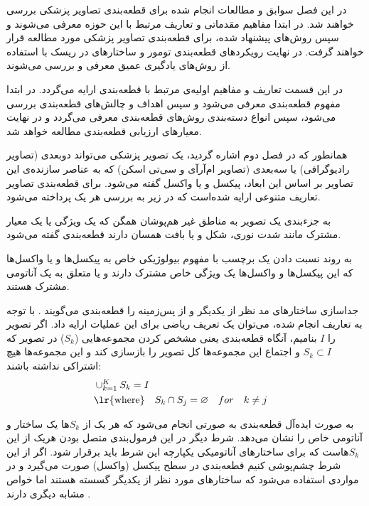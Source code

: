 

در این فصل سوابق و مطالعات انجام شده برای قطعه‌بندی تصاویر پزشکی بررسی خواهند شد. در ابتدا مفاهیم مقدماتی و تعاریف مرتبط با این حوزه معرفی می‌شوند و سپس روش‌های پیشنهاد شده، برای قطعه‌بندی تصاویر پزشکی مورد مطالعه قرار خواهند گرفت. در نهایت رویکردهای قطعه‌بندی تومور و ساختارهای در ریسک با استفاده از روش‌‌های یادگیری عمیق معرفی و بررسی می‌شوند.

در این قسمت تعاریف و مفاهیم اولیه‌ی مرتبط با قطعه‌بندی ارایه می‌گردد. در ابتدا مفهوم قطعه‌بندی معرفی می‌شود و سپس اهداف و چالش‌های قطعه‌بندی بررسی می‌شود، سپس انواع دسته‌بندی روش‌های قطعه‌بندی معرفی می‌گردد و در نهایت معیارهای ارزیابی قطعه‌بندی مطالعه خواهد شد.

همانطور که در فصل دوم اشاره گردید، یک تصویر پزشکی می‌تواند دوبعدی (تصاویر رادیوگرافی) یا سه‌بعدی (تصاویر ام‌آرآی و سی‌تی اسکن) که به عناصر سازنده‌ی این تصاویر بر اساس این ابعاد، پیکسل و یا واکسل گفته می‌شود. برای قطعه‌بندی تصاویر تعاریف متنوعی ارایه شده‌است که در زیر به بررسی هر یک پرداخته می‌شود.

 به جزء‌بندی یک تصویر به مناطق غیر هم‌پوشان همگن که یک ویژگی یا یک معیار مشترک مانند شدت نوری، شکل و یا بافت همسان دارند قطعه‌بندی گفته می‌شود.

 به روند نسبت دادن یک برچسب با مفهوم بیولوژیکی خاص به پیکسل‌ها و یا واکسل‌ها که این پیکسل‌ها و واکسل‌ها یک ویژگی خاص مشترک دارند و یا متعلق به یک آناتومی مشترک هستند. 

 جداسازی ساختارهای مد نظر از یکدیگر و از پس‌زمینه را قطعه‌بندی می‌گویند .
با توجه به تعاریف انجام شده، می‌توان یک تعریف ریاضی برای این عملیات ارایه داد. اگر تصویر را $I$ بنامیم، آنگاه قطعه‌بندی یعنی مشخص کردن مجموعه‌هایی ($S_{k}$) در تصویر که $S_{k} \subset I$ و اجتماع این مجموعه‌ها کل تصویر را بازسازی کند و این مجموعه‌ها هیچ اشتراکی نداشته باشند:
\begin{alignat}{5}
	 &\cup_{k=1}^{K} S_{k} = I     \label{seg_def} && \\
	 &\text{\lr{where}} \quad S_{k} \cap S_{j} = \varnothing \quad for \quad k \neq j && \notag
\end{alignat}

به صورت ایده‌آل قطعه‌بندی به صورتی انجام می‌شود که هر یک از $S_{k}$ها یک ساختار و آناتومی خاص را نشان می‌دهد. شرط دیگر در این فرمول‌بندی متصل بودن هریک از این $S_{k}$هاست که برای ساختارهای آناتومیکی یکپارچه این شرط باید برقرار شود. اگر از این شرط چشم‌پوشی کنیم قطعه‌بندی در سطح پیکسل (واکسل) صورت می‌گیرد و در مواردی استفاده می‌شود که ساختارهای مورد نظر از یکدیگر گسسته هستند اما خواص مشابه دیگری دارند . 

